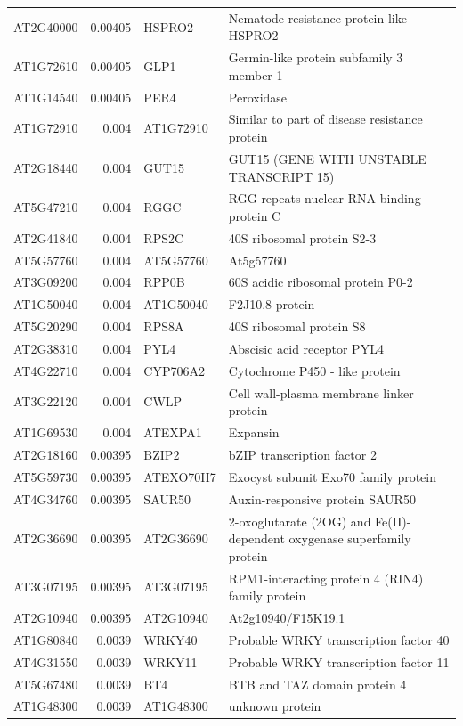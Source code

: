 \documentclass[11pt]{article}
\begin{document}
\begin{center}
\begin{tabular}{lrll}
AT2G40000 & 0.00405 & HSPRO2 & Nematode resistance protein-like HSPRO2\\
AT1G72610 & 0.00405 & GLP1 & Germin-like protein subfamily 3 member 1\\
AT1G14540 & 0.00405 & PER4 & Peroxidase\\
AT1G72910 & 0.004 & AT1G72910 & Similar to part of disease resistance protein\\
AT2G18440 & 0.004 & GUT15 & GUT15 (GENE WITH UNSTABLE TRANSCRIPT 15)\\
AT5G47210 & 0.004 & RGGC & RGG repeats nuclear RNA binding protein C\\
AT2G41840 & 0.004 & RPS2C & 40S ribosomal protein S2-3\\
AT5G57760 & 0.004 & AT5G57760 & At5g57760\\
AT3G09200 & 0.004 & RPP0B & 60S acidic ribosomal protein P0-2\\
AT1G50040 & 0.004 & AT1G50040 & F2J10.8 protein\\
AT5G20290 & 0.004 & RPS8A & 40S ribosomal protein S8\\
AT2G38310 & 0.004 & PYL4 & Abscisic acid receptor PYL4\\
AT4G22710 & 0.004 & CYP706A2 & Cytochrome P450 - like protein\\
AT3G22120 & 0.004 & CWLP & Cell wall-plasma membrane linker protein\\
AT1G69530 & 0.004 & ATEXPA1 & Expansin\\
AT2G18160 & 0.00395 & BZIP2 & bZIP transcription factor 2\\
AT5G59730 & 0.00395 & ATEXO70H7 & Exocyst subunit Exo70 family protein\\
AT4G34760 & 0.00395 & SAUR50 & Auxin-responsive protein SAUR50\\
AT2G36690 & 0.00395 & AT2G36690 & 2-oxoglutarate (2OG) and Fe(II)-dependent oxygenase superfamily protein\\
AT3G07195 & 0.00395 & AT3G07195 & RPM1-interacting protein 4 (RIN4) family protein\\
AT2G10940 & 0.00395 & AT2G10940 & At2g10940/F15K19.1\\
AT1G80840 & 0.0039 & WRKY40 & Probable WRKY transcription factor 40\\
AT4G31550 & 0.0039 & WRKY11 & Probable WRKY transcription factor 11\\
AT5G67480 & 0.0039 & BT4 & BTB and TAZ domain protein 4\\
AT1G48300 & 0.0039 & AT1G48300 & unknown protein\\

\end{tabular}
\end{center}
\end{document}
